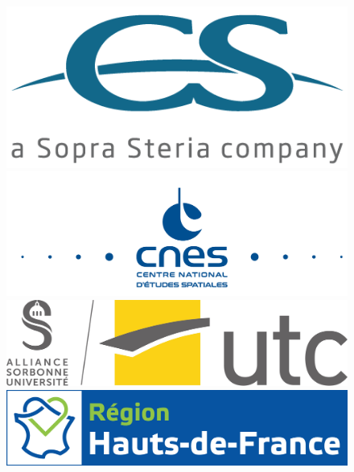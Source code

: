 \begin{titlepage}
\begin{center}
        \begin{figure}[h!]
            \begin{minipage}{0.24\linewidth}
                \vspace{0.6cm}
                \centering\includegraphics[width=\linewidth]{Images/General/Logo_CS.png}
            \end{minipage}\hfill
            \begin{minipage}{0.25\linewidth}
                \centering\includegraphics[width=\linewidth]{Images/General/Logo_CNES.png}
            \end{minipage}\hfill
            \begin{minipage}{0.25\linewidth}
                \vspace{0.6cm}
                \centering\includegraphics[width=\linewidth]{Images/General/Logo_UTC.jpg}
            \end{minipage}\hfill
            \begin{minipage}{0.24\linewidth}
                \vspace{0.8cm}
                \centering\includegraphics[width=\linewidth]{Images/General/Logo Région HDF - partenaire.jpg}
            \end{minipage}
        \end{figure}
    \end{center}
\end{titlepage}